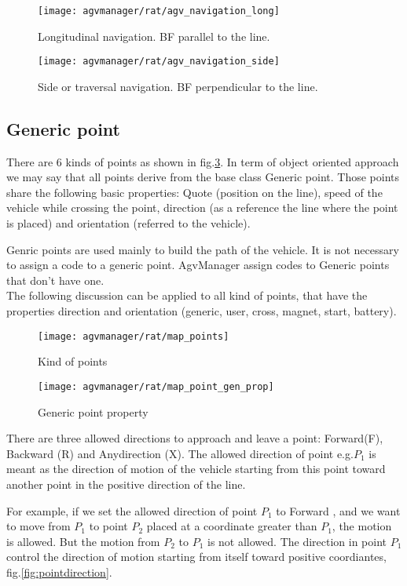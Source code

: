 \begin{figure}[h]
	\centering\texttt{[image: agvmanager/rat/agv\_navigation\_long]}
	\caption{Longitudinal navigation. BF parallel to the line.}
	\label{fig:navigLong}
\end{figure}
\begin{figure}[h]
	\centering\texttt{[image: agvmanager/rat/agv\_navigation\_side]}
	\caption{Side or traversal navigation. BF perpendicular to the line.}
	\label{fig:navigSide}
\end{figure}

\subsection{Generic point}
There are 6 kinds of points as shown in fig.\ref{fig:pointKind}. In term of object oriented approach we may say that all points derive from the base class Generic point.
Those points share the following basic properties: Quote (position on the line), speed of the vehicle while crossing the point, direction (as a reference the line where the point is placed) and orientation (referred to the vehicle).

Genric points are used mainly to build the path of the vehicle. It is not necessary to assign a code to a generic point. AgvManager assign codes to Generic points that don't have one.\\

The following discussion can be applied to all kind of points, that have the properties direction and orientation (generic, user, cross, magnet, start, battery).

\begin{figure}[h]
	\centering\texttt{[image: agvmanager/rat/map\_points]}
	\caption{Kind of points}
	\label{fig:pointKind}
\end{figure}
\begin{figure}[h]
	\centering\texttt{[image: agvmanager/rat/map\_point\_gen\_prop]}
	\caption{Generic point property}
	\label{fig:GenericPoint}
\end{figure}

There are three allowed directions to approach and leave a point: Forward(F), Backward (R) and Anydirection (X).
The allowed direction of point e.g.$P_{1}$ is meant as the direction of motion of the vehicle starting from this point toward another point in the positive direction of the line.

For example, if we set the allowed direction of point $P_{1}$ to Forward , and we want to move from $P_{1}$ to point $P_{2}$ placed at a coordinate greater than $P_{1}$, the motion is allowed. But the motion from $P_{2}$ to $P_{1}$ is not allowed. The direction in point $P_{1}$ control the direction of motion starting from itself toward positive coordiantes, fig.\ref{fig:pointdirection}.\\

